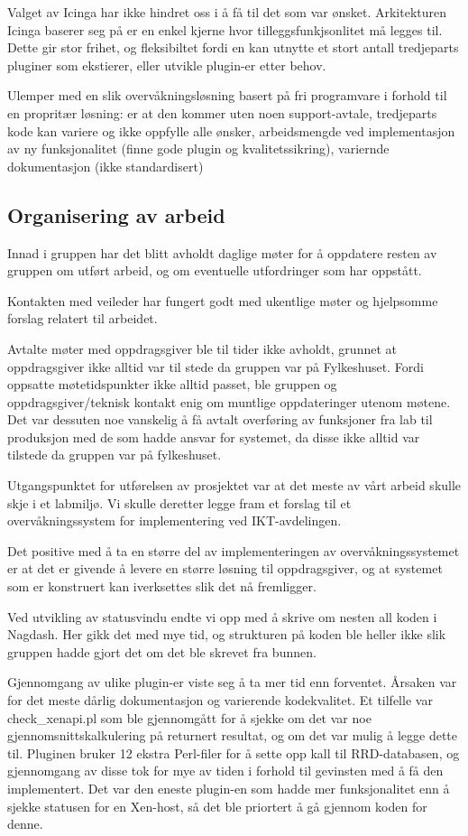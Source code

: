 Valget av Icinga har ikke hindret oss i å få til det som var ønsket. Arkitekturen Icinga baserer seg på er en enkel kjerne hvor tilleggsfunkjsonlitet må legges til. Dette gir stor frihet, og fleksibiltet fordi en kan utnytte et stort antall tredjeparts pluginer som ekstierer, eller utvikle plugin-er etter behov. 

Ulemper med en slik overvåkningsløsning basert på fri programvare i forhold til en propritær løsning:
 er at den kommer uten noen support-avtale, 
tredjeparts kode kan variere og ikke oppfylle alle ønsker, 
arbeidsmengde ved implementasjon av ny funksjonalitet (finne gode plugin og kvalitetssikring), 
variernde dokumentasjon (ikke standardisert) 

\subsection{Organisering av arbeid}
Innad i gruppen har det blitt avholdt daglige møter for å oppdatere resten av gruppen om utført arbeid, og om eventuelle utfordringer som har oppstått. 

Kontakten med veileder har fungert godt med ukentlige møter og hjelpsomme forslag relatert til arbeidet.

Avtalte møter med oppdragsgiver ble til tider ikke avholdt, grunnet at oppdragsgiver ikke alltid var til stede da gruppen var på Fylkeshuset. Fordi oppsatte møtetidspunkter ikke alltid passet, ble gruppen og oppdragsgiver/teknisk kontakt enig om muntlige oppdateringer utenom møtene. Det var dessuten noe vanskelig å få avtalt overføring av funksjoner fra lab til produksjon med de som hadde ansvar for systemet, da disse ikke alltid var tilstede da gruppen var på fylkeshuset. 

Utgangspunktet for utførelsen av prosjektet var at det meste av vårt arbeid skulle skje i et labmiljø. Vi skulle deretter legge fram et forslag til et overvåkningssystem for implementering ved IKT-avdelingen.

Det positive med å ta en større del av implementeringen av overvåkningssystemet er at det er givende å levere en større løsning til oppdragsgiver, og at systemet som er konstruert kan iverksettes slik det nå fremligger.

Ved utvikling av statusvindu endte vi opp med å skrive om nesten all koden i Nagdash. Her gikk det med mye tid, og strukturen på koden ble heller ikke slik gruppen hadde gjort det om det ble skrevet fra bunnen. 

Gjennomgang av ulike plugin-er viste seg å ta mer tid enn forventet. Årsaken var for det meste dårlig dokumentasjon og varierende kodekvalitet. Et tilfelle var check\_xenapi.pl som ble gjennomgått for å sjekke om det var noe gjennomsnittskalkulering på returnert resultat, og om det var mulig å legge dette til. Pluginen bruker 12 ekstra Perl-filer for å sette opp kall til RRD-databasen, og gjennomgang av disse tok for mye av tiden i forhold til gevinsten med å få den implementert. Det var den eneste plugin-en som hadde mer funksjonalitet enn å sjekke statusen for en Xen-host, så det ble priortert å gå gjennom koden for denne. 

